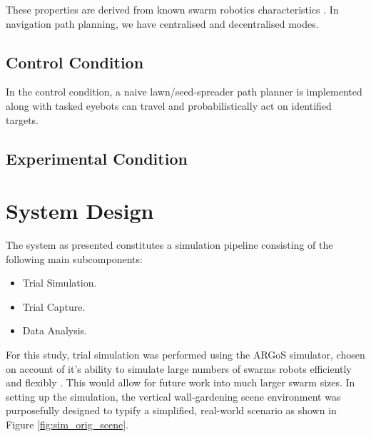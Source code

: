 \documentclass{report}
\begin{document}
These properties are derived from known swarm robotics characteristics \cite{Dorigo2013}. In navigation path planning, we have centralised and decentralised modes.

\subsection{Control Condition}
In the control condition, a naive lawn/seed-spreader path planner \cite{Galceran2013} is implemented along with tasked eyebots can travel and probabilistically act on identified targets.
\subsection{Experimental Condition}

\section{System Design} \label{system_design}
The system as presented constitutes a simulation pipeline consisting of the following main subcomponents:
\begin{itemize}
	\item Trial Simulation.
	\item Trial Capture.
	\item Data  Analysis.
\end{itemize}

For this study, trial simulation was performed using the ARGoS simulator, chosen on account of it's ability to simulate large numbers of swarms robots efficiently and flexibly \cite{Pinciroli2014}. This would allow for future work into much larger swarm sizes. In setting up the simulation, the vertical wall-gardening scene environment was purposefully designed to typify a simplified, real-world scenario as shown in Figure \ref{fig:sim_orig_scene}.
\end{document}
